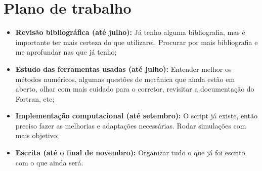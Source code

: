 \chapter{Plano de trabalho}

\begin{itemize}
    \item \textbf{Revisão bibliográfica (até julho):} Já tenho alguma bibliografia, mas é importante ter mais certeza do que utilizarei. Procurar por mais bibliografia e me aprofundar nas que já tenho;
    \item \textbf{Estudo das ferramentas usadas (até julho):} Entender melhor os métodos numéricos, algumas questões de mecânica que ainda estão em aberto, olhar com mais cuidado para o corretor, revisitar a documentação do Fortran, etc;
    \item \textbf{Implementação computacional (até setembro):} O script já existe, então preciso fazer as melhorias e adaptações necessárias. Rodar simulações com mais objetivo;
    \item \textbf{Escrita (até o final de novembro):} Organizar tudo o que já foi escrito com o que ainda será.
\end{itemize}